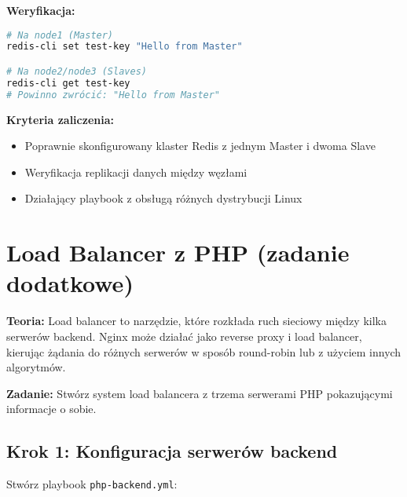 \documentclass{article}
\begin{document}
\textbf{Weryfikacja:}
\begin{lstlisting}[language=bash]
# Na node1 (Master)
redis-cli set test-key "Hello from Master"

# Na node2/node3 (Slaves)  
redis-cli get test-key
# Powinno zwrócić: "Hello from Master"
\end{lstlisting}

\textbf{Kryteria zaliczenia:}
\begin{itemize}
    \item Poprawnie skonfigurowany klaster Redis z jednym Master i dwoma Slave
    \item Weryfikacja replikacji danych między węzłami
    \item Działający playbook z obsługą różnych dystrybucji Linux
\end{itemize}

\section{Load Balancer z PHP (zadanie dodatkowe)}

\textbf{Teoria:}  
Load balancer to narzędzie, które rozkłada ruch sieciowy między kilka serwerów backend. Nginx może działać jako reverse proxy i load balancer, kierując żądania do różnych serwerów w sposób round-robin lub z użyciem innych algorytmów.

\textbf{Zadanie:} Stwórz system load balancera z trzema serwerami PHP pokazującymi informacje o sobie.

\subsection*{Krok 1: Konfiguracja serwerów backend}

Stwórz playbook \texttt{php-backend.yml}:
\end{document}
